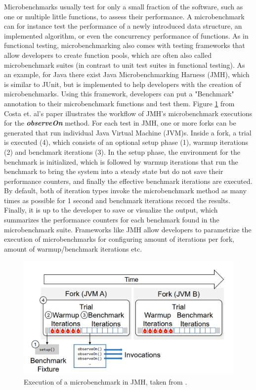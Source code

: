 \documentclass{seal_thesis}
\begin{document}
Microbenchmarks usually test for only a small fraction of the software, such as one or multiple little functions, to assess their performance. A microbenchmark can for instance test the performance of a newly introduced data structure, an implemented algorithm, or even the concurrency performance of functions\cite{costa2019}. As in functional testing, microbenchmarking also comes with testing frameworks that allow developers to create function pools, which are often also called microbenchmark suites (in contrast to unit test suites in functional testing). As an example, for Java there exist Java Microbenchmarking Harness (JMH), which is similar to JUnit, but is implemented to help developers with the creation of microbenchmarks\cite{JMH}. Using this framework, developers can put a "Benchmark" annotation to their microbenchmark functions and test them\cite{JMH}. Figure \ref{fig:JMHBenchmark} from Costa et. al's paper \cite{costa2019} illustrates the workflow of JMH's microbenchmark executions for the \textbf{\textit{observeOn}} method. For each test in JMH, one or more forks can be generated that run individual Java Virtual Machine (JVM)s. Inside a fork, a trial is executed (4), which consists of an optional setup phase (1), warmup iterations (2) and benchmark iterations (3). In the setup phase, the environment for the benchmark is initialized, which is followed by warmup iterations that run the benchmark to bring the system into a steady state but do not save their performance counters, and finally the effective benchmark iterations are executed. By default, both of iteration types invoke the microbenchmark method as many times as possible for 1 second and benchmark iterations record the results. Finally, it is up to the developer to save or visualize the output, which summarizes the performance counters for each benchmark found in the microbenchmark suite. Frameworks like JMH \cite{JMH} allow developers to parametrize the execution of microbenchmarks for configuring amount of iterations per fork, amount of warmup/benchmark iterations etc.\\


\begin{figure}
	\centering
	\includegraphics[width=\linewidth]{JMHBenchmark}
	\caption{Execution of a microbenchmark in JMH, taken from \cite{costa2019}.}
	\label{fig:JMHBenchmark}
\end{figure}
\end{document}
